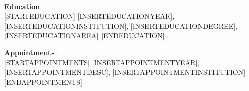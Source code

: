 

\def\NameBoldface#1{\textbf{#1}}              %
\def\NameColor{Blue}                          %
\def\NameSize{\large }                        %
\def\LabelBoldface#1{\textbf{#1}}             %
\def\SectionSpacing{\par \vspace{-0.5em}}     %
\def\PublicationBullet{\scriptsize{$\bullet$}{\hspace{-0.3em}}}

\NameBoldface{\color{\NameColor}{\NameSize [INSERTNAME] ([INSERTROLE]):}}\\
[INSERTAFFILIATION]

\SectionSpacing
\LabelBoldface{Education}\\
[STARTEDUCATION]
[INSERTEDUCATIONYEAR], [INSERTEDUCATIONINSTITUTION], [INSERTEDUCATIONDEGREE], [INSERTEDUCATIONAREA]
[ENDEDUCATION]

\SectionSpacing
\LabelBoldface{Appointments}\\
[STARTAPPOINTMENTS]
[INSERTAPPOINTMENTYEAR], [INSERTAPPOINTMENTDESC], [INSERTAPPOINTMENTINSTITUTION]
[ENDAPPOINTMENTS]

